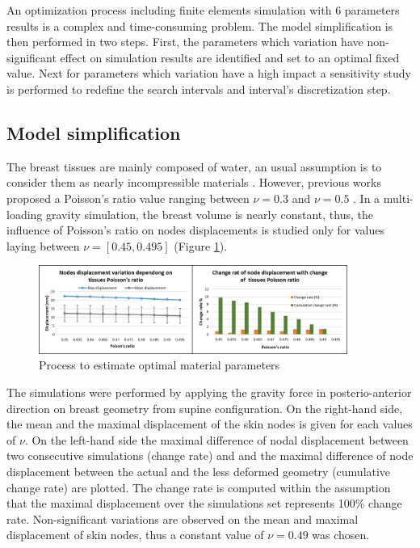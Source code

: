  An optimization process including finite elements simulation with 6 parameters results is a complex and time-consuming problem. The model simplification is then performed in two steps. First, the parameters which variation have non-significant effect on simulation results are identified and set to an optimal fixed value. Next for parameters which variation have a high impact a sensitivity study is performed to redefine the search intervals and interval's discretization step.
 
 \subsection{Model simplification}

The breast tissues are mainly composed of water, an usual assumption is to consider them as nearly incompressible materials \citep{fung_biomechanics_2013}. However,
previous works proposed a Poisson's ratio value ranging between $\nu = 0.3$ \citep{hopp_automatic_2013} and $\nu = 0.5$ \citep{gamage_modelling_2012}. In a multi-loading gravity simulation, the breast volume is nearly constant, thus, the influence of Poisson's ratio on nodes displacements is studied only for values laying between $\nu = [0.45 , 0.495]$ (Figure \ref{fig:poissonRatio}). 

\begin{figure}[!h]
\centering
\includegraphics[width=0.9\textwidth,keepaspectratio]{figures/poissonRatio.jpg} 
\caption{Process to estimate optimal material parameters}\label{fig:poissonRatio}
\end{figure}

The simulations were performed by applying the gravity force in posterio-anterior direction on breast geometry from supine configuration. On the right-hand side, the mean and the maximal displacement of the skin nodes is given for each values of $\nu$. On the left-hand side the maximal difference of nodal displacement between two consecutive simulations (change rate) and and the maximal difference of node displacement between the actual and the less deformed geometry (cumulative change rate) are plotted. The change rate is computed within the assumption that the maximal displacement over the simulations set represents 100\% change rate. Non-significant variations are observed on the mean and maximal displacement of skin nodes, thus a constant value of $\nu = 0.49$ was chosen.


